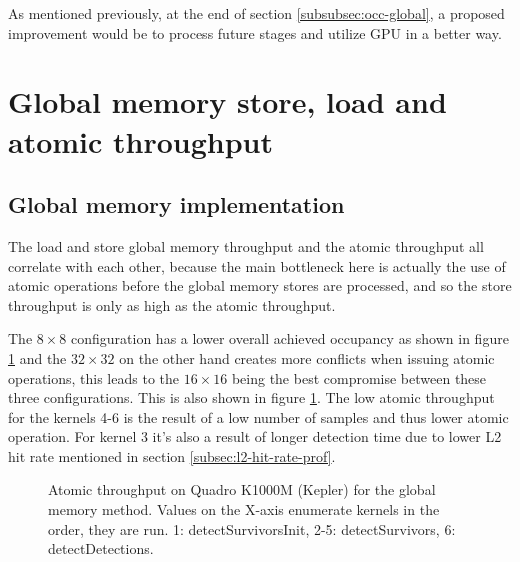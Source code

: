 As mentioned previously, at the end of section \ref{subsubsec:occ-global}, a proposed improvement would be to process future stages and utilize GPU in a better way.

\section{Global memory store, load and atomic throughput}

\subsection{Global memory implementation}

The load and store global memory throughput and the atomic throughput all correlate with each other, because the main bottleneck here is actually the use of atomic operations before the global memory stores are processed, and so the store throughput is only as high as the atomic throughput.

The $8 \times 8$ configuration has a lower overall achieved occupancy as shown in figure \ref{fig:occupancy-quadro} and the $32 \times 32$ on the other hand creates more conflicts when issuing atomic operations, this leads to the $16 \times 16$ being the best compromise between these three configurations. This is also shown in figure \ref{fig:occupancy-quadro}. The low atomic throughput for the kernels 4-6 is the result of a low number of samples and thus lower atomic operation. For kernel 3 it's also a result of longer detection time due to lower L2 hit rate mentioned in section \ref{subsec:l2-hit-rate-prof}.

\begin{figure}[ht]
\centering{}
	\caption{Atomic throughput on Quadro K1000M (Kepler) for the global memory method. Values on the X-axis enumerate kernels in the order, they are run. 1: detectSurvivorsInit, 2-5: detectSurvivors, 6: detectDetections.}
	\label{fig:occupancy-quadro}
\end{figure}

